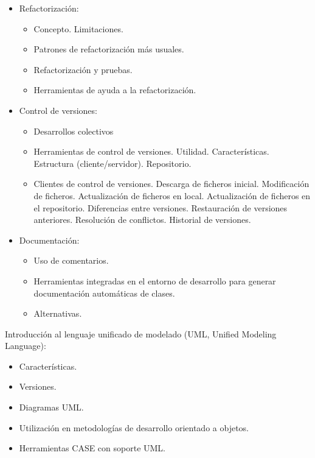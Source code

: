 \documentclass[a4paper]{article}
\begin{document}
\begin{itemize}
\item Refactorización:
\begin{itemize}
\item Concepto. Limitaciones.
\item Patrones de refactorización más usuales.
\item Refactorización y pruebas.
\item Herramientas de ayuda a la refactorización.
\end{itemize}
\item Control de versiones:
\begin{itemize}
\item Desarrollos colectivos
\item Herramientas de control de versiones. Utilidad. Características. Estructura (cliente/servidor). Repositorio.
\item Clientes de control de versiones. Descarga de ficheros inicial. Modificación de ficheros. Actualización de ficheros en local. Actualización de ficheros en el repositorio. Diferencias entre versiones. Restauración de versiones anteriores. Resolución de conflictos. Historial de versiones.
\end{itemize}

\item Documentación:
\begin{itemize}
\item Uso de comentarios.
\item Herramientas integradas en el entorno de desarrollo para generar documentación automáticas de clases.
\item Alternativas.
\end{itemize}
\end{itemize}

Introducción al lenguaje unificado de modelado (UML, Unified Modeling Language):
\begin{itemize}
\item Características.
\item Versiones.
\item Diagramas UML.
\item Utilización en metodologías de desarrollo orientado a objetos.
\item Herramientas CASE con soporte UML.
\end{itemize}
\end{document}

